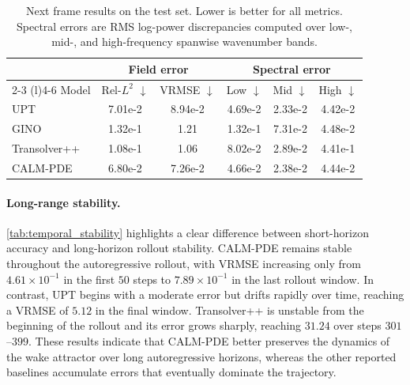 \documentclass{article}
\begin{document}
\begin{table}[t]
    \centering
    \caption{Next frame results on the test set. Lower is
    better for all metrics. Spectral errors are RMS log-power discrepancies computed over low-, mid-, and high-frequency \textcolor{revcolor}{spanwise} wavenumber bands.}
    \label{tab:main_results}
    \small
    \setlength{\tabcolsep}{5.5pt}
    \begin{tabular*}{\linewidth}{@{\extracolsep{\fill}}lccccc@{}}
        \toprule
        & \multicolumn{2}{c}{Field error}
        & \multicolumn{3}{c}{Spectral error} \\
        \cmidrule(lr){2-3}
        \cmidrule(l){4-6}
        Model
        & Rel-$L^2$ $\downarrow$
        & VRMSE $\downarrow$
        & Low $\downarrow$
        & Mid $\downarrow$
        & High $\downarrow$ \\
        \midrule
        UPT          & 7.01e-2 & 8.94e-2 & 4.69e-2 & 2.33e-2 & 4.42e-2 \\
        GINO         & 1.32e-1 & 1.21    & 1.32e-1 & 7.31e-2 & 4.48e-2     \\
        Transolver++ & 1.08e-1 & 1.06    & 8.02e-2 & 2.89e-2 & 4.41e-1 \\
        CALM-PDE     & 6.80e-2 & 7.26e-2 & 4.66e-2 & 2.38e-2 & 4.44e-2      \\
        \bottomrule
    \end{tabular*}
\end{table}

\paragraph{Long-range stability.}
\autoref{tab:temporal_stability} highlights a clear difference between short-horizon accuracy and long-horizon rollout stability. CALM-PDE remains stable throughout the autoregressive rollout, with VRMSE increasing only from $4.61\times 10^{-1}$ in the first $50$ steps to $7.89\times 10^{-1}$ in the last rollout window. In contrast, UPT begins with a moderate error but drifts rapidly over time, reaching a VRMSE of $5.12$ in the final window. Transolver++ is unstable from the beginning of the rollout and its error grows sharply, reaching $31.24$ over steps $301$--$399$. These results indicate that CALM-PDE better preserves the dynamics of the wake attractor over long autoregressive horizons, whereas the other reported baselines accumulate errors that eventually dominate the trajectory. 
\end{document}
